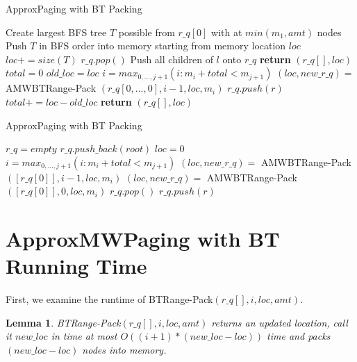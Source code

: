 \documentclass[letterpaper,12pt,titlepage,oneside,final]{book}
\theoremstyle{plain}
\newtheorem{lem}[thm]{Lemma}
\begin{document}
\begin{algorithm}[H]
\caption{ApproxPaging with BT Packing}
\label{AMWBTPack}
\begin{algorithmic}[1]
	\State Create largest BFS tree $T$ possible from $r\_q[0]$ with at $min(m_1, amt)$ nodes
	\State Push $T$ in BFS order into memory starting from memory location $loc$
	\State $loc += size(T)$
	\State $r\_q.pop()$
		\State Push all children of $l$ onto $r\_q$
	\EndFor
	\State \textbf{return} $(r\_q[], loc)$		
\Else
	\State $total = 0$
		\State $old\_loc = loc$
		\State $i = max_{0,...,j+1}(i : m_i + total < m_{j+1})$
		\State $(loc, new\_r\_q) =$ AMWBT\textendash Range-Pack $(r\_q[0,...,0], i-1, loc, m_i)$
			\State $r\_q.push(r)$
		\EndFor
		\State $total += loc-old\_loc$
	\EndWhile
	\State \textbf{return} $(r\_q[], loc)$
\EndIf
\EndProcedure
\end{algorithmic}
\end{algorithm}

\begin{algorithm}[H]
\caption{ApproxPaging with BT Packing}
\label{AMWBTPack}
\begin{algorithmic}[1]
\State $r\_q = empty$
\State $r\_q.push\_back(root)$
\State $loc = 0$
			\State $i = max_{0,...,j+1}(i : m_i + total < m_{j+1})$
			\State $(loc, new\_r\_q) =$ AMWBT\textendash Range-Pack $([r\_q[0]], i-1, loc, m_i)$		
		\Else
			\State $(loc, new\_r\_q) =$ AMWBT\textendash Range-Pack $([r\_q[0]], 0, loc, m_i)$
		\EndIf
		\State $r\_q.pop()$
			\State $r\_q.push(r)$
		\EndFor
	\EndWhile
\EndFor
\EndProcedure
\end{algorithmic}
\end{algorithm}


\section{ApproxMWPaging with BT Running Time }

First, we examine the runtime of BT\textendash Range-Pack$(r\_q[], i, loc, amt)$.

\begin{lem}
BT\textendash Range-Pack$(r\_q[], i, loc, amt)$ returns an updated location, call it $new\_loc$ in time at most $O((i+1)*(new\_loc - loc))$ time and packs $(new\_loc - loc)$ nodes into memory.
\end{lem}
\end{document}
